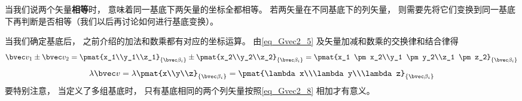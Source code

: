 当我们说两个矢量\textbf{相等}时， 意味着同一基底下两矢量的坐标全都相等。 若两矢量在不同基底下的列矢量， 则需要先将它们变换到同一基底下再判断是否相等（我们以后再讨论如何进行基底变换）。

当我们确定基底后， 之前介绍的加法和数乘都有对应的坐标运算。 由\autoref{eq_Gvec2_5} 及矢量加减和数乘的交换律和结合律得
\begin{equation}\label{eq_Gvec2_8}
\bvec v_1 \pm \bvec v_2 = \pmat{x_1\\y_1\\z_1}_{\{\bvec\beta_i\}} \pm \pmat{x_2\\y_2\\z_2}_{\{\bvec\beta_i\}} = \pmat{x_1 \pm x_2\\y_1 \pm y_2\\z_1 \pm z_2}_{\{\bvec\beta_i\}}
\end{equation}
\begin{equation}\label{eq_Gvec2_9}
\lambda \bvec v = \lambda\pmat{x\\y\\z}_{\{\bvec\beta_i\}} = \pmat{\lambda x\\\lambda y\\\lambda z}_{\{\bvec\beta_i\}}
\end{equation}
要特别注意， 当定义了多组基底时， 只有基底相同的两个列矢量按照\autoref{eq_Gvec2_8} 相加才有意义。
